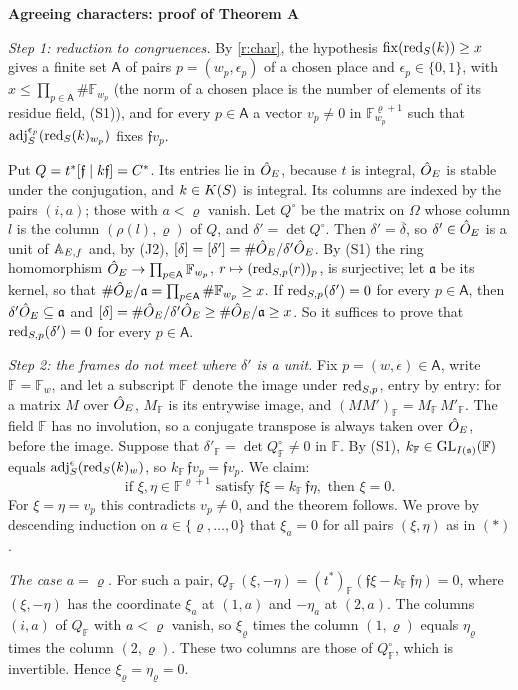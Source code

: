 \documentclass[11pt,a4paper]{article}
\makeatletter
\newcommand{\sect}[2]{\refstepcounter{section}\label{#2}\par\addvspace{19pt plus 4pt minus 2pt}\Needspace{7\baselineskip}%
  \noindent\llap{{\fontsize{13.2}{16}\selectfont\bfseries\color{inkfaint}\thesection}\hspace{9pt}}%
  {\fontsize{13.2}{16}\selectfont\bfseries\color{ink}#1}\par\nopagebreak\vspace{-1pt}}
\theoremstyle{plainx}
\theoremstyle{uprightx}
\renewenvironment{proof}[1][Proof]{\par\pushQED{\qed}\normalfont\topsep0pt\partopsep0pt
  \trivlist\item[\hskip\labelsep\itshape #1.]\ignorespaces}{\popQED\endtrivlist\@endpefalse}
\newcommand{\Fw}[1]{\mathbb{F}_{#1}}                       %
\newcommand{\cj}[1]{\overline{#1}}
\newcommand{\sA}{\mathsf{A}}
\newcommand{\rF}[1]{#1_{\mathbb{F}}}                       %
\makeatother
\begin{document}
\sect{Agreeing characters: proof of Theorem A}{s:agree}
\begin{proof}[Proof of Theorem A]
\emph{Step 1: reduction to congruences.} By \ref{r:char}, the hypothesis $\operatorname{fix}(\mathrm{red}_{S}(k))\ge x$ gives a finite
set $\sA$ of pairs $p=(w_p,\epsilon_p)$ of a chosen place and $\epsilon_p\in\{0,1\}$, with
$x\le\prod_{p\in\sA}\#\Fw{w_p}$ (the norm of a chosen place is the number of elements of its residue field,
(S1)), and for every $p\in\sA$ a vector $v_p\ne0$ in $\Fw{w_p}^{\varrho+1}$ such that
$\operatorname{adj}_{S}^{\epsilon_p}(\mathrm{red}_{S}(k)_{w_p})$ fixes $\mathfrak f v_p$.

Put $Q=t^{*}[\mathfrak{f}\mid k\mathfrak{f}]=C^{*}$. Its entries lie in $\hat{O}_E$, because $t$ is integral, $\hat{O}_E$ is stable under the
conjugation, and $k\in K(S)$ is integral. Its columns are indexed by the pairs $(i,a)$; those with $a<\varrho$
vanish. Let $Q^{\circ}$ be the matrix on $\Omega$ whose column $l$ is the column $(\rho(l),\varrho)$ of $Q$, and
$\delta'=\det Q^{\circ}$. Then $\delta'=\cj{\delta}$, so $\delta'\in\hat{O}_E$ is a unit of $\mathbb{A}_{E,f}$ and, by (J2),
$[\delta]=[\delta']=\#\hat{O}_E/\delta'\hat{O}_E$. By (S1) the ring homomorphism
$\hO\to\prod_{p\in\sA}\Fw{w_p}$, $r\mapsto(\mathrm{red}_{S,p}(r))_{p}$, is surjective; let $\mathfrak a$ be its kernel, so
that $\#\hO/\mathfrak a=\prod_{p\in\sA}\#\Fw{w_p}\ge x$. If $\mathrm{red}_{S,p}(\delta')=0$ for every $p\in\sA$, then
$\delta'\hat{O}_E\subseteq\mathfrak a$ and $[\delta]=\#\hat{O}_E/\delta'\hat{O}_E\ge\#\hat{O}_E/\mathfrak a\ge x$. So it suffices to
prove that $\mathrm{red}_{S,p}(\delta')=0$ for every $p\in\sA$.

\emph{Step 2: the frames do not meet where $\delta'$ is a unit.} Fix $p=(w,\epsilon)\in\sA$, write
$\mathbb F=\Fw{w}$, and let a subscript $\mathbb F$ denote the image under $\mathrm{red}_{S,p}$, entry by entry: for a matrix
$M$ over $\hat{O}_E$, $\rF{M}$ is its entrywise image, and $\rF{(MM')}=\rF{M}\,\rF{M'}$. The field $\mathbb F$ has no
involution, so a conjugate transpose is always taken over $\hat{O}_E$, before the image. Suppose that
$\rF{\delta'}=\det\rF{Q^{\circ}}\ne0$ in $\mathbb F$. By (S1), $\rF{k}\in\GL_{\Ix{\fs}}(\mathbb F)$ equals
$\operatorname{adj}_{S}^{\epsilon}(\mathrm{red}_{S}(k)_{w})$, so $\rF{k}\,\mathfrak f v_p=\mathfrak f v_p$. We claim:
\[\text{if }\xi,\eta\in\mathbb F^{\varrho+1}\text{ satisfy }\mathfrak f\xi=\rF{k}\,\mathfrak f\eta,\text{ then }\xi=0.\tag{$*$}\]
For $\xi=\eta=v_p$ this contradicts $v_p\ne0$, and the theorem follows. We prove by descending induction on
$a\in\{\varrho,\dots,0\}$ that $\xi_a=0$ for all pairs $(\xi,\eta)$ as in $(*)$.

\emph{The case $a=\varrho$.} For such a pair, $\rF{Q}\,(\xi,-\eta)=\rF{(t^{*})}(\mathfrak f\xi-\rF{k}\,\mathfrak f\eta)=0$,
where $(\xi,-\eta)$ has the coordinate $\xi_a$ at $(1,a)$ and $-\eta_a$ at $(2,a)$. The columns $(i,a)$ of
$\rF{Q}$ with $a<\varrho$ vanish, so $\xi_\varrho$ times the column $(1,\varrho)$ equals $\eta_\varrho$ times the
column $(2,\varrho)$. These two columns are those of $\rF{Q^{\circ}}$, which is invertible. Hence
$\xi_\varrho=\eta_\varrho=0$.


\end{proof}
\end{document}
